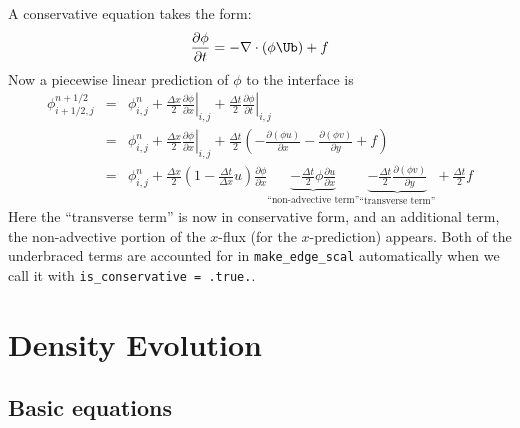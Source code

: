 A conservative equation takes the form:
\begin{equation}
\frac{\partial \phi}{\partial t} = -\nabla \cdot ( \phi \Ub) + f
\end{equation}
%
Now a piecewise linear prediction of $\phi$ to the interface is 
\begin{eqnarray}
\phi_{i+1/2,j}^{n+1/2} &=& \phi_{i,j}^n 
    + \left . \frac{\Delta x}{2} \frac{\partial \phi}{\partial x} \right |_{i,j}
    + \left . \frac{\Delta t}{2} \frac{\partial \phi}{\partial t} \right |_{i,j} \\
 &=& \phi_{i,j}^n 
    + \left . \frac{\Delta x}{2} \frac{\partial \phi}{\partial x} \right |_{i,j}
    +  \frac{\Delta t}{2} \left ( -\frac{\partial (\phi u)}{\partial x} 
                                  -\frac{\partial (\phi v)}{\partial y} + f \right ) \\
 &=& \phi_{i,j}^n + \frac{\Delta x}{2} \left ( 1 - \frac{\Delta t}{\Delta x} u \right ) 
           \frac{\partial \phi}{\partial x} 
    \underbrace{- \frac{\Delta t}{2} \phi \frac{\partial u}{\partial x} }_{\text{``non-advective~term''}}
                \underbrace{- \frac{\Delta t}{2} \frac{\partial (\phi v)}{\partial y}}_{\text{``transverse~term''}} + \frac{\Delta t}{2} f
\end{eqnarray}
Here the ``transverse term'' is now in conservative form, and an additional
term, the non-advective portion of the
$x$-flux (for the $x$-prediction) appears.  Both of the underbraced terms are
accounted for in {\tt make\_edge\_scal} automatically when we call it
with {\tt is\_conservative = .true.}.


\section{Density Evolution}

\label{sec:pred:density}

\subsection{Basic equations}

